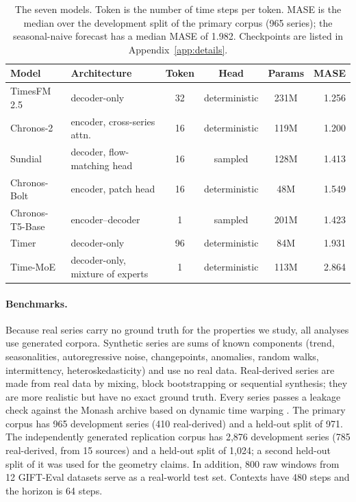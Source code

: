 \documentclass[twoside,11pt]{article}
\begin{document}
\begin{table}[!tb]
\centering
\small
\setlength{\tabcolsep}{3.5pt}
\begin{tabular}{@{}llcccr@{}}
\toprule
Model & Architecture & Token & Head & Params & MASE \\
\midrule
\textcolor{tfm}{TimesFM 2.5} & decoder-only & 32 & deterministic & 231M & 1.256 \\
\textcolor{ctwo}{Chronos-2} & encoder, cross-series attn. & 16 & deterministic & 119M & 1.200 \\
\textcolor{sun}{Sundial} & decoder, flow-matching head & 16 & sampled & 128M & 1.413 \\
\textcolor{bolt}{Chronos-Bolt} & encoder, patch head & 16 & deterministic & 48M & 1.549 \\
\textcolor{tt5}{Chronos-T5-Base} & encoder--decoder & 1 & sampled & 201M & 1.423 \\
\textcolor{timer}{Timer} & decoder-only & 96 & deterministic & 84M & 1.931 \\
\textcolor{tmoe}{Time-MoE} & decoder-only, mixture of experts & 1 & deterministic & 113M & 2.864 \\
\bottomrule
\end{tabular}
\caption{The seven models. Token is the number of time steps per token. MASE is the median over the development split of the primary corpus (965 series); the seasonal-naive forecast has a median MASE of 1.982. Checkpoints are listed in Appendix~\ref{app:details}.}
\label{tab:models}
\end{table}

\paragraph{Benchmarks.}
\label{sec:benchmarks}
Because real series carry no ground truth for the properties we study, all analyses use generated corpora.
Synthetic series are sums of known components (trend, seasonalities, autoregressive noise, changepoints, anomalies, random walks, intermittency, heteroskedasticity) and use no real data.
Real-derived series are made from real data by mixing, block bootstrapping \citep{kunsch1989block} or sequential synthesis; they are more realistic but have no exact ground truth.
Every series passes a leakage check against the Monash archive \citep{godahewa2021monash} based on dynamic time warping \citep{sakoe1978dtw}.
The primary corpus has 965 development series (410 real-derived) and a held-out split of 971.
The independently generated replication corpus has 2{,}876 development series (785 real-derived, from 15 sources) and a held-out split of 1{,}024; a second held-out split of it was used for the geometry claims.
In addition, 800 raw windows from 12 GIFT-Eval datasets serve as a real-world test set.
Contexts have 480 steps and the horizon is 64 steps.
\end{document}
